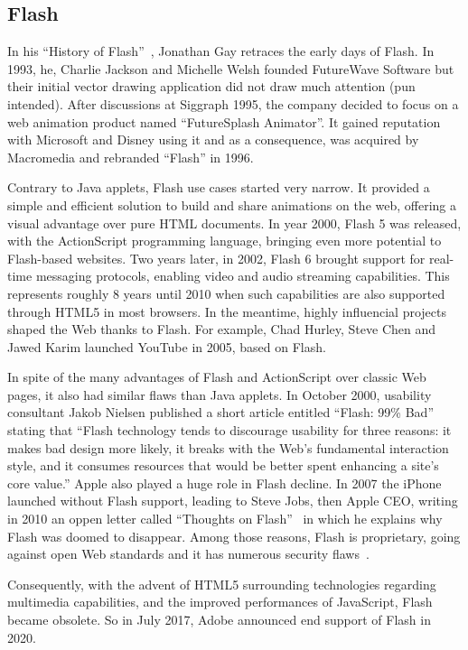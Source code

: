 \subsection{Flash}%
\label{sub:Flash}

In his ``History of Flash''~\cite{HistoryFlash}, Jonathan Gay retraces the early days of Flash.
In 1993, he, Charlie Jackson and Michelle Welsh founded FutureWave Software
but their initial vector drawing application did not draw much attention (pun intended).
After discussions at Siggraph 1995, the company decided to focus on a web animation
product named ``FutureSplash Animator''.
It gained reputation with Microsoft and Disney using it and as a consequence,
was acquired by Macromedia and rebranded ``Flash'' in 1996.

Contrary to Java applets, Flash use cases started very narrow.
It provided a simple and efficient solution to build and share animations on the web,
offering a visual advantage over pure HTML documents.
In year 2000, Flash 5 was released, with the ActionScript programming language,
bringing even more potential to Flash-based websites.
Two years later, in 2002, Flash 6 brought support for real-time messaging protocols,
enabling video and audio streaming capabilities.
This represents roughly 8 years until 2010 when such capabilities are also
supported through HTML5 in most browsers.
In the meantime, highly influencial projects shaped the Web thanks to Flash.
For example, Chad Hurley, Steve Chen and Jawed Karim launched
YouTube in 2005, based on Flash.

In spite of the many advantages of Flash and ActionScript over classic Web pages,
it also had similar flaws than Java applets.
In October 2000, usability consultant Jakob Nielsen published a short article
entitled ``Flash: 99\% Bad''~\cite{FlashBadNielsen} stating that
``Flash technology tends to discourage usability for three reasons:
it makes bad design more likely,
it breaks with the Web's fundamental interaction style,
and it consumes resources that would be better spent enhancing a site's core value.''
Apple also played a huge role in Flash decline.
In 2007 the iPhone launched without Flash support,
leading to Steve Jobs, then Apple CEO, writing in 2010 an oppen letter called
``Thoughts on Flash''~\cite{FlashJobs}
in which he explains why Flash was doomed to disappear.
Among those reasons, Flash is proprietary, going against open Web standards
and it has numerous security flaws~\cite{FlashCVE}.

Consequently, with the advent of HTML5 surrounding technologies regarding multimedia capabilities,
and the improved performances of JavaScript, Flash became obsolete.
So in July 2017, Adobe announced end support of Flash in 2020.

